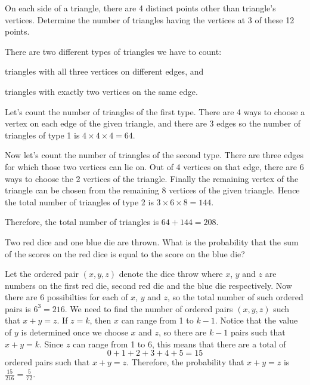 \begin{question}
    On each side of a triangle, there are 4 distinct points other than
    triangle's vertices. Determine the number of triangles having the vertices
    at 3 of these 12 points.
\end{question}
\begin{solution}
    There are two different types of triangles we have to count: 
    \begin{enumerate*}[label=(\arabic*)]
        \item triangles with all three vertices on different edges, and

        \item triangles with exactly two vertices on the same edge.
    \end{enumerate*}

    Let's count the number of triangles of the first type. There are 4 ways to
    choose a vertex on each edge of the given triangle, and there are 3 edges
    so the number of triangles of type 1 is $4 \times 4 \times 4 = 64$.

    Now let's count the number of triangles of the second type. There are three
    edges for which those two vertices can lie on. Out of 4 vertices on that
    edge, there are 6 ways to choose the 2 vertices of the triangle. Finally
    the remaining vertex of the triangle can be chosen from the remaining 8
    vertices of the given triangle. Hence the total number of triangles of type
    2 is $3 \times 6 \times 8 = 144$. 
    
    Therefore, the total number of triangles is $64 + 144 = 208$. 
\end{solution}

\begin{question}
    Two red dice and one blue die are thrown. What is the probability that the
    sum of the scores on the red dice is equal to the score on the blue die? 
\end{question}
\begin{solution}
    Let the ordered pair $(x, y, z)$ denote the dice throw where $x$, $y$ and
    $z$ are numbers on the first red die, second red die and the blue die
    respectively. Now there are 6 possibilties for each of $x$, $y$ and $z$, so
    the total number of such ordered pairs is $6^3 = 216$. We need to find the
    number of ordered pairs $(x, y, z)$ such that $x + y = z$. If $z = k$, then
    $x$ can range from 1 to $k - 1$. Notice that the value of $y$ is determined
    once we choose $x$ and $z$, so there are $k - 1$ pairs such that $x + y =
    k$. Since $z$ can range from 1 to 6, this means that there are a total of
    \[ 0 + 1 + 2 + 3 + 4 + 5 = 15 \]
    ordered pairs such that $x + y = z$. Therefore, the probability that $x + y
    = z$ is $\frac{15}{216} = \frac{5}{72}$. 
\end{solution}


